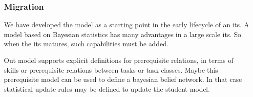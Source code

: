 \subsubsection{Migration}
We have developed the model as a starting point in the early lifecycle of an \gls{its}.
A model based on Bayesian statistics has many advantages in a large scale \gls{its}.
So when the \gls{its} matures, such capabilities must be added.

Out model supports explicit definitions for prerequisite relations, in terms of skills or prerequisite relations between tasks or task classes.
Maybe this prerequisite model can be used to define a bayesian belief network.
In that case statistical update rules may be defined to update the student model.



